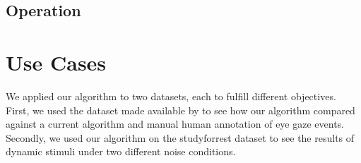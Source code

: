 \documentclass[10pt,a4paper]{extarticle}
\begin{document}

\subsection*{Operation}

\section*{Use Cases} %
We applied our algorithm to two datasets, each to fulfill different objectives. First, we used the dataset made available by \citet{Andersson2017} to see how our algorithm compared against a current algorithm and manual human annotation of eye gaze events. Secondly, we used our algorithm on the studyforrest dataset \cite{Hanke2016} to see the results of dynamic stimuli under two different noise conditions.
\end{document}
